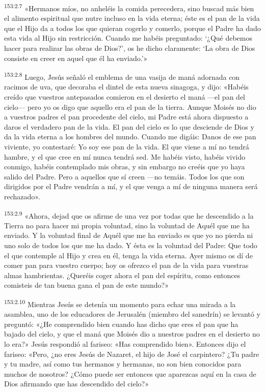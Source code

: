 \par 
\textsuperscript{153:2.7} «Hermanos míos, no anheléis la comida perecedera, sino buscad más bien el alimento espiritual que nutre incluso en la vida eterna; éste es el pan de la vida que el Hijo da a todos los que quieran cogerlo y comerlo, porque el Padre ha dado esta vida al Hijo sin restricción. Cuando me habéis preguntado: `¿Qué debemos hacer para realizar las obras de Dios?', os he dicho claramente: `La obra de Dios consiste en creer en aquel que él ha enviado.'»

\par 
\textsuperscript{153:2.8} Luego, Jesús señaló el emblema de una vasija de maná adornada con racimos de uva, que decoraba el dintel de esta nueva sinagoga, y dijo: «Habéis creído que vuestros antepasados comieron en el desierto el maná ---el pan del cielo--- pero yo os digo que aquello era el pan de la tierra. Aunque Moisés no dio a vuestros padres el pan procedente del cielo, mi Padre está ahora dispuesto a daros el verdadero pan de la vida. El pan del cielo es lo que desciende de Dios y da la vida eterna a los hombres del mundo. Cuando me digáis: Danos de ese pan viviente, yo contestaré: Yo soy ese pan de la vida. El que viene a mí no tendrá hambre, y el que cree en mí nunca tendrá sed. Me habéis visto, habéis vivido conmigo, habéis contemplado mis obras, y sin embargo no creéis que yo haya salido del Padre. Pero a aquellos que sí creen ---no temáis. Todos los que son dirigidos por el Padre vendrán a mí, y el que venga a mí de ninguna manera será rechazado».

\par 
\textsuperscript{153:2.9} «Ahora, dejad que os afirme de una vez por todas que he descendido a la Tierra no para hacer mi propia voluntad, sino la voluntad de Aquél que me ha enviado. Y la voluntad final de Aquél que me ha enviado es que yo no pierda ni uno solo de todos los que me ha dado. Y ésta es la voluntad del Padre: Que todo el que contemple al Hijo y crea en él, tenga la vida eterna. Ayer mismo os dí de comer pan para vuestro cuerpo; hoy os ofrezco el pan de la vida para vuestras almas hambrientas. ¿Queréis coger ahora el pan del espíritu, como entonces comisteis de tan buena gana el pan de este mundo?»

\par 
\textsuperscript{153:2.10} Mientras Jesús se detenía un momento para echar una mirada a la asamblea, uno de los educadores de Jerusalén (miembro del sanedrín) se levantó y preguntó: «¿He comprendido bien cuando has dicho que eres el pan que ha bajado del cielo, y que el maná que Moisés dio a nuestros padres en el desierto no lo era?» Jesús respondió al fariseo: «Has comprendido bien». Entonces dijo el fariseo: «Pero, ¿no eres Jesús de Nazaret, el hijo de José el carpintero? ¿Tu padre y tu madre, así como tus hermanos y hermanas, no son bien conocidos para muchos de nosotros? ¿Cómo puede ser entonces que aparezcas aquí en la casa de Dios afirmando que has descendido del cielo?»

